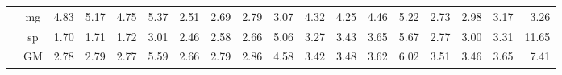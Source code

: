 \begin{table*}[]
\begin{center}
{\begin{tabular}{|c|c|rrrr|rrrr|rrrr|rrrr|}
 &  mg  &  4.83  &  5.17  & \cellcolor{blue!25} 4.75  &   5.37  &  2.51  &  2.69  &  2.79  &  3.07  &  4.32  & \cellcolor{blue!25} 4.25  &  4.46  &   5.22  &  2.73  &  2.98  &  3.17  &   3.26 \\
 &  sp  &  1.70  &  1.71  &  1.72  &   3.01  &  2.46  &  2.58  &  2.66  &  5.06  &  3.27  &  3.43  &  3.65  &   5.67  &  2.77  &  3.00  &  3.31  &  11.65 \\
 &  GM  &  2.78  &  2.79  & \cellcolor{blue!25} 2.77  &   5.59  &  2.66  &  2.79  &  2.86  &  4.58  &  3.42  &  3.48  &  3.62  &   6.02  &  3.51  & \cellcolor{blue!25} 3.46  &  3.65  &   7.41 \\
\hline 
\end{tabular} }

\end{center}
\end{table*}

